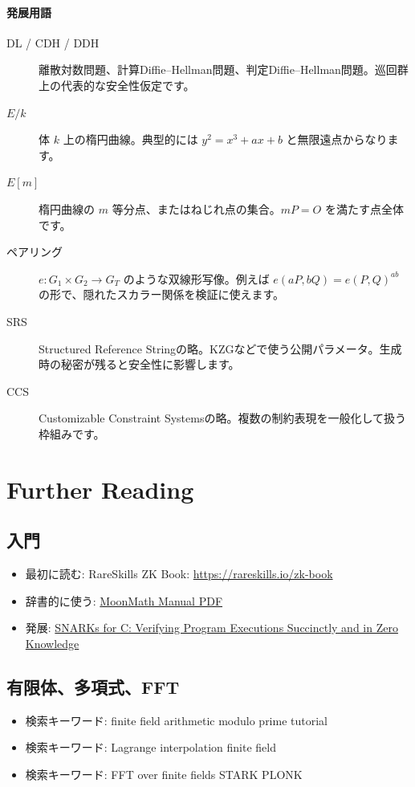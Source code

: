 \documentclass[a4paper,11pt]{ltjsarticle}
\begin{document}
\paragraph*{発展用語}
\begin{description}
  \item[DL / CDH / DDH] 離散対数問題、計算Diffie--Hellman問題、判定Diffie--Hellman問題。巡回群上の代表的な安全性仮定です。
  \item[\(E/k\)] 体 \(k\) 上の楕円曲線。典型的には \(y^2=x^3+ax+b\) と無限遠点からなります。
  \item[{\(E[m]\)}] 楕円曲線の \(m\) 等分点、またはねじれ点の集合。\(mP=O\) を満たす点全体です。
  \item[ペアリング] \(e:G_1\times G_2\to G_T\) のような双線形写像。例えば \(e(aP,bQ)=e(P,Q)^{ab}\) の形で、隠れたスカラー関係を検証に使えます。
  \item[SRS] Structured Reference Stringの略。KZGなどで使う公開パラメータ。生成時の秘密が残ると安全性に影響します。
  \item[CCS] Customizable Constraint Systemsの略。複数の制約表現を一般化して扱う枠組みです。
\end{description}

\section{Further Reading}

\subsection{入門}

\begin{itemize}
  \item 最初に読む: RareSkills ZK Book: \url{https://rareskills.io/zk-book}
  \item 辞書的に使う: \href{https://leastauthority.com/static/publications/MoonMath080822.pdf}{MoonMath Manual PDF}
  \item 発展: \href{https://eprint.iacr.org/2013/507.pdf}{SNARKs for C: Verifying Program Executions Succinctly and in Zero Knowledge}
\end{itemize}

\subsection{有限体、多項式、FFT}

\begin{itemize}
  \item 検索キーワード: finite field arithmetic modulo prime tutorial
  \item 検索キーワード: Lagrange interpolation finite field
  \item 検索キーワード: FFT over finite fields STARK PLONK
\end{itemize}
\end{document}
